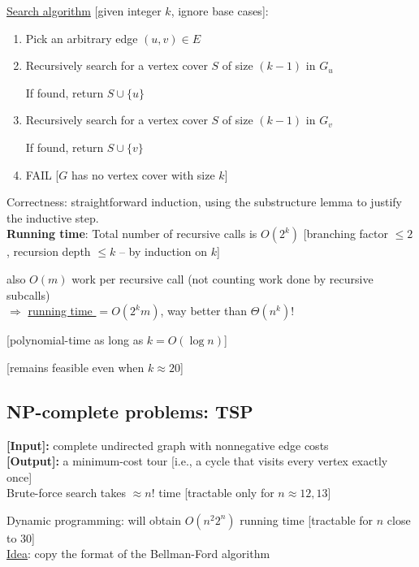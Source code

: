 \documentclass[a4paper,12pt]{article}
\theoremstyle{plain}
\theoremstyle{definition}
\theoremstyle{remark}
\begin{document}
\underline{Search algorithm} [given integer $k$, ignore base cases]:
\begin{enumerate}
	\item Pick an arbitrary edge $(u, v) \in E$
	\item Recursively search for a vertex cover $S$ of size $(k-1)$ in $G_u$
	
	If found, return $S \cup \{u\}$
	\item Recursively search for a vertex cover $S$ of size $(k-1)$ in $G_v$
	
	If found, return $S \cup \{v\}$
	\item FAIL [$G$ has no vertex cover with size $k$]
\end{enumerate}

Correctness: straightforward induction, using the substructure lemma to justify the inductive step.
\\

\textbf{Running time}: Total number of recursive calls is $O(2^k)$ [branching factor $\leq 2$, recursion depth $\leq k$ -- by induction on $k$]

also $O(m)$ work per recursive call (not counting work done by recursive subcalls)
\\

$\Rightarrow$ \underline{running time $= O(2^k m)$}, way better than $\Theta(n^k)$!

[polynomial-time as long as $k = O(\log n)$]

[remains feasible even when $k \approx 20$]



\subsection{NP-complete problems: TSP}
\textbf{[Input]:} complete undirected graph with nonnegative edge costs
\\

\textbf{[Output]:} a minimum-cost tour [i.e., a cycle that visits every vertex exactly once]
\\

Brute-force search takes $\approx n!$ time [tractable only for $n \approx 12,13$]

Dynamic programming: will obtain $O(n^2 2^n)$ running time [tractable for $n$ close to $30$]
\\

\underline{Idea}: copy the format of the Bellman-Ford algorithm
\\
\end{document}
